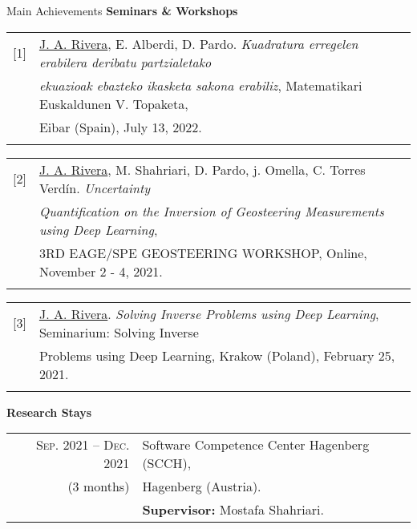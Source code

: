 \begin{frame}{Main Achievements}
\textbf{Seminars \& Workshops}
\vspace{0.2cm}

\begin{small}
\begin{tabular}{rl}
[1] &\underline{J. A. Rivera}, E. Alberdi, D. Pardo. \textit{Kuadratura erregelen erabilera deribatu partzialetako} \\
& \textit{ekuazioak ebazteko ikasketa sakona erabiliz}, Matematikari Euskaldunen V. Topaketa, \\
& Eibar (Spain), July 13, 2022.\\\\
\end{tabular}

\begin{tabular}{rl}
[2] &\underline{J. A. Rivera}, M. Shahriari, D. Pardo, j. Omella, C. Torres Verd\'in. \textit{Uncertainty} \\
& \textit{Quantification on the Inversion of Geosteering Measurements using Deep Learning}, \\
& 3RD EAGE/SPE GEOSTEERING WORKSHOP, Online, November 2 - 4, 2021.\\\\
\end{tabular}

\begin{tabular}{rl}
[3] &\underline{J. A. Rivera}. \textit{Solving Inverse Problems using Deep Learning}, Seminarium: Solving Inverse \\
& Problems using Deep Learning, Krakow (Poland), February 25, 2021.\\\\
\end{tabular}
\end{small}

\textbf{Research Stays}
\vspace{0.2cm}

\begin{small}
\begin{tabular}{rl}	
\textsc{Sep.} 2021 -- \textsc{Dec.} 2021&Software Competence Center Hagenberg (SCCH),  \\
(3 months)& Hagenberg (Austria). \\
&\textbf{Supervisor:} Mostafa Shahriari.\\
\end{tabular}
\end{small}

\end{frame}